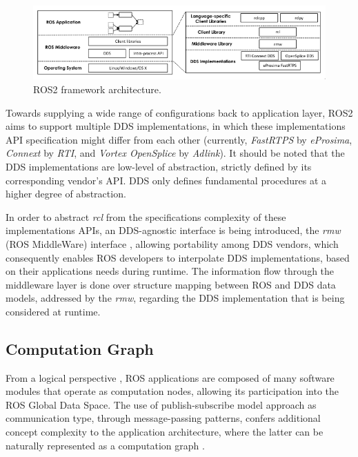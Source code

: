 \begin{figure}[H]
    \centering
    \includegraphics[width=\linewidth]{img/ros2-architecture.png}
    \caption{ROS2 framework architecture.}
    \label{fig:ros2-architecture}
\end{figure}

Towards supplying a wide range of configurations back to application layer, ROS2 aims to support multiple DDS implementations, in which these implementations API specification might differ from each other (currently, \textit{FastRTPS} by \textit{eProsima}, \textit{Connext} by \textit{RTI}, and \textit{Vortex OpenSplice} by \textit{Adlink}). It should be noted that the DDS implementations are low-level of abstraction, strictly defined by its corresponding vendor's API. DDS only defines fundamental procedures at a higher degree of abstraction.  

In order to abstract \textit{rcl} from the specifications complexity of these implementations APIs, an DDS-agnostic interface is being introduced, the \textit{rmw} (ROS MiddleWare) interface \cite{casini2019response}, allowing portability among DDS vendors, which consequently enables ROS developers to interpolate DDS implementations, based on their applications needs during runtime. The information flow through the middleware layer is done over structure mapping between ROS and DDS data models, addressed by the \textit{rmw}, regarding the DDS implementation that is being considered at runtime.

\subsection{Computation Graph}

From a logical perspective \cite{casini2019response}, ROS applications are composed of many software modules that operate as computation nodes, allowing its participation into the ROS Global Data Space. The use of publish-subscribe model approach as communication type, through message-passing patterns, confers additional concept complexity to the application architecture, where the latter can be naturally represented as a computation graph \cite{cousins2010welcome}.

